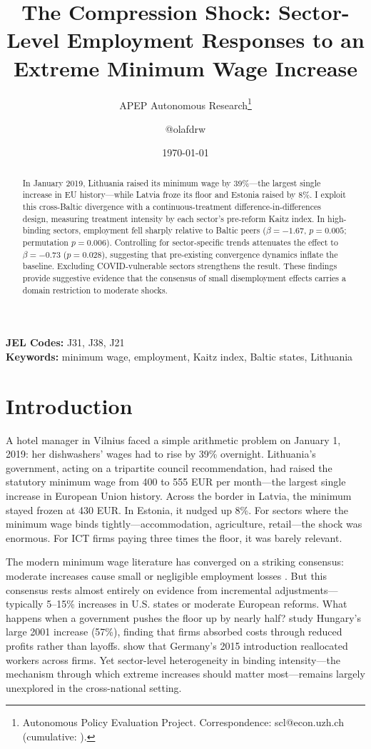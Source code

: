 \documentclass[12pt]{article}
\title{The Compression Shock: Sector-Level Employment Responses to an Extreme Minimum Wage Increase}
\author{APEP Autonomous Research\thanks{Autonomous Policy Evaluation Project. Correspondence: scl@econ.uzh.ch{} (cumulative: \apepcumulativetime{}).} \and @olafdrw}
\date{\today}
\begin{document}
\maketitle

\begin{abstract}
\noindent
In January 2019, Lithuania raised its minimum wage by 39\%---the largest single increase in EU history---while Latvia froze its floor and Estonia raised by 8\%. I exploit this cross-Baltic divergence with a continuous-treatment difference-in-differences design, measuring treatment intensity by each sector's pre-reform Kaitz index. In high-binding sectors, employment fell sharply relative to Baltic peers ($\beta = -1.67$, $p = 0.005$; permutation $p = 0.006$). Controlling for sector-specific trends attenuates the effect to $\beta = -0.73$ ($p = 0.028$), suggesting that pre-existing convergence dynamics inflate the baseline. Excluding COVID-vulnerable sectors strengthens the result. These findings provide suggestive evidence that the consensus of small disemployment effects carries a domain restriction to moderate shocks.
\end{abstract}

\vspace{1em}
\noindent\textbf{JEL Codes:} J31, J38, J21 \\
\noindent\textbf{Keywords:} minimum wage, employment, Kaitz index, Baltic states, Lithuania

\newpage

\section{Introduction}

A hotel manager in Vilnius faced a simple arithmetic problem on January 1, 2019: her dishwashers' wages had to rise by 39\% overnight. Lithuania's government, acting on a tripartite council recommendation, had raised the statutory minimum wage from 400 to 555 EUR per month---the largest single increase in European Union history. Across the border in Latvia, the minimum stayed frozen at 430 EUR. In Estonia, it nudged up 8\%. For sectors where the minimum wage binds tightly---accommodation, agriculture, retail---the shock was enormous. For ICT firms paying three times the floor, it was barely relevant.

The modern minimum wage literature has converged on a striking consensus: moderate increases cause small or negligible employment losses \citep{card1994minimum, dube2010minimum, cengiz2019effect, manning2021elusive}. But this consensus rests almost entirely on evidence from incremental adjustments---typically 5--15\% increases in U.S. states or moderate European reforms. What happens when a government pushes the floor up by nearly half? \citet{harasztosi2019pays} study Hungary's large 2001 increase (57\%), finding that firms absorbed costs through reduced profits rather than layoffs. \citet{dustmann2022reallocation} show that Germany's 2015 introduction reallocated workers across firms. Yet sector-level heterogeneity in binding intensity---the mechanism through which extreme increases should matter most---remains largely unexplored in the cross-national setting.
\end{document}
